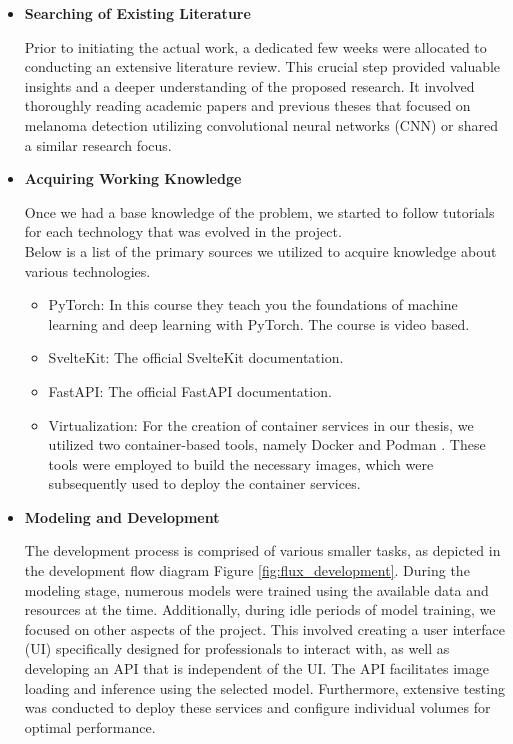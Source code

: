 \begin{itemize}
  \item{\textbf{Searching of Existing Literature}}

    Prior to initiating the actual work, a dedicated few weeks were allocated
    to conducting an extensive literature review. This crucial step provided
    valuable insights and a deeper understanding of the proposed research. It
    involved thoroughly reading academic papers and previous theses that
    focused on melanoma detection utilizing convolutional neural networks (CNN)
    or shared a similar research focus.

  \item{\textbf{Acquiring Working Knowledge}}

    Once we had a base knowledge of the problem, we started to follow tutorials
    for each technology that was evolved in the project. \\

    Below is a list of the primary sources we utilized to acquire knowledge
    about various technologies.

    \begin{itemize}

      \item PyTorch: \cite{LearnPyTorch} In this course they teach you the
        foundations of machine learning and deep learning with PyTorch. The
        course is video based.

      \item SvelteKit: \cite{LearnSvelteKit} The official SvelteKit
        documentation.

      \item FastAPI: \cite{LearnFastAPI} The official FastAPI documentation.

      \item Virtualization: For the creation of container services in our thesis, we
        utilized two container-based tools, namely Docker \cite{LearnDocker} and
        Podman \cite{LearnPodman}. These tools were employed to build the
        necessary images, which were subsequently used to deploy the container
        services.

    \end{itemize}

  \item{\textbf{Modeling and Development}}

    The development process is comprised of various smaller tasks, as depicted
    in the development flow diagram Figure \ref{fig:flux_development}.
    During the modeling stage, numerous models were trained using the available
    data and resources at the time. Additionally, during idle periods of model
    training, we focused on other aspects of the project. This involved
    creating a user interface (UI) specifically designed for professionals to
    interact with, as well as developing an API that is independent of the UI.
    The API facilitates image loading and inference using the selected model.
    Furthermore, extensive testing was conducted to deploy these services and
    configure individual volumes for optimal performance.


\end{itemize}
